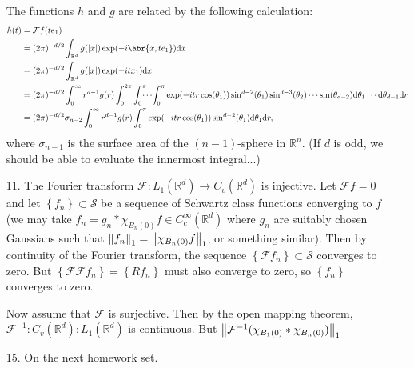 \documentclass[11pt,leqno]{article}
\theoremstyle{plain}
\theoremstyle{definition}
\numberwithin{equation}{section}
\numberwithin{lem}{section}
\newcommand{\cbr}[1]{\left\{#1\right\}}
\newcommand{\eq}[1]{\overset{#1}{=}}
\begin{document}
\begin{enumerate}
    The functions $h$ and $g$ are related by the following calculation: \begin{align*}
      h(t) &= \mathcal Ff(te_1)\\
      &= (2\pi)^{-d/2}\int_{\mathbb R^d}g(\abs{x})\exp(-i\abr{x,te_1})\dd x\\
      &= (2\pi)^{-d/2}\int_{\mathbb R^d}g(\abs{x})\exp(-itx_1)\dd x \\
      &= (2\pi)^{-d/2}\int_0^\infty r^{d-1}g(r)\int_0^{2\pi}\int_0^\pi\!\!\!\!\cdots\!\int_0^\pi\exp(-itr\cos(\theta_1))\sin^{d-2}(\theta_1)\sin^{d-3}(\theta_2)\cdots\sin(\theta_{d-2})\dd\theta_1\cdots\dd\theta_{d-1}\dd r\\
      &= (2\pi)^{-d/2}\sigma_{n-2}\int_0^\infty r^{d-1}g(r)\int_0^\pi\exp(-itr\cos(\theta_1))\sin^{d-2}(\theta_1)\dd\theta_1\dd r,
    \end{align*}
    where $\sigma_{n-1}$ is the surface area of the $(n-1)$-sphere in $\mathbb R^n$. (If $d$ is odd, we should be able to evaluate the innermost integral...)
    \item[11.] The Fourier transform $\mathcal F\colon L_1(\mathbb R^d)\to C_v(\mathbb R^d)$ is injective. Let $\mathcal Ff = 0$ and let $\cbr{f_n}\subset \mathcal S$ be a sequence of Schwartz class functions converging to $f$ (we may take $f_n = g_n\ast \chi_{B_n(0)}f\in C_c^\infty(\mathbb R^d)$ where $g_n$ are suitably chosen Gaussians such that $\norm{f_n}_1 = \norm{\chi_{B_n(0)}f}_1$, or something similar). Then by continuity of the Fourier transform, the sequence $\cbr{\mathcal Ff_n}\subset \mathcal S$ converges to zero. But $\cbr{\mathcal F\mathcal Ff_n} = \cbr{Rf_n}$ must also converge to zero, so $\cbr{f_n}$ converges to zero. 
    
    Now assume that $\mathcal F$ is surjective. Then by the open mapping theorem, $\mathcal F^{-1}\colon C_v(\mathbb R^d)\colon L_1(\mathbb R^d)$ is continuous. But $\norm{\mathcal F^{-1}(\chi_{B_1(0)}\ast \chi_{B_n(0)})}_1 $
    \item[15.] On the next homework set.
\end{enumerate}
\end{document}
